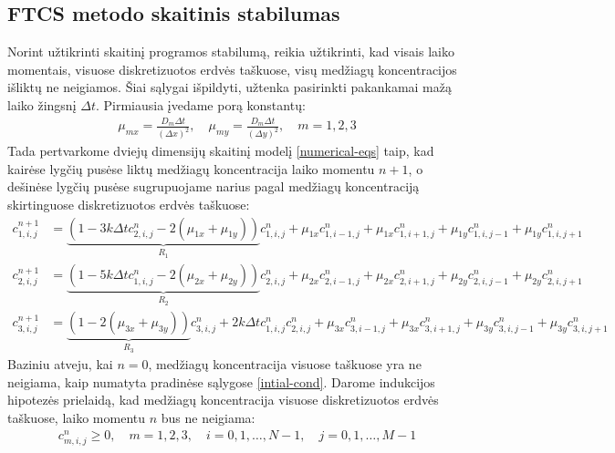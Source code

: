 \newpage
\subsection{FTCS metodo skaitinis stabilumas}

Norint užtikrinti skaitinį programos stabilumą, reikia užtikrinti, kad visais laiko momentais, visuose diskretizuotos erdvės taškuose, visų medžiagų koncentracijos išliktų ne neigiamos. Šiai sąlygai išpildyti, užtenka pasirinkti pakankamai mažą laiko žingsnį $\Delta t$. Pirmiausia įvedame porą konstantų:
\begin{align*}
\mu_{mx} = \frac{D_m\Delta t}{(\Delta x)^2}, \quad
\mu_{my} = \frac{D_m\Delta t}{(\Delta y)^2}, \quad m = 1, 2, 3
\end{align*}
Tada pertvarkome dviejų dimensijų skaitinį modelį \eqref{numerical-eqs} taip, kad kairėse lygčių pusėse liktų medžiagų koncentracija laiko momentu $n+1$, o dešinėse lygčių pusėse sugrupuojame narius pagal medžiagų koncentraciją skirtinguose diskretizuotos erdvės taškuose:
\begin{subequations} \label{eqs:r-coefs}
  \begin{align}
  c^{n+1}_{1,i,j}&=
  \underbrace{(1-3k\Delta tc^{n}_{2,i,j}-2(\mu_{1x}+\mu_{1y}))}_{R_1}c^n_{1,i,j}
  +\mu_{1x}c^n_{1,i-1,j}+\mu_{1x}c^n_{1,i+1,j}+\mu_{1y}c^n_{1,i,j-1}+\mu_{1y}c^n_{1,i,j+1} \label{r-coefs1}\\
  c^{n+1}_{2,i,j}&=
  \underbrace{(1-5k\Delta tc^{n}_{1,i,j}-2(\mu_{2x}+\mu_{2y}))}_{R_2}c^n_{2,i,j}
  +\mu_{2x}c^n_{2,i-1,j}+\mu_{2x}c^n_{2,i+1,j}+\mu_{2y}c^n_{2,i,j-1}+\mu_{2y}c^n_{2,i,j+1} \label{r-coefs2}\\
  c^{n+1}_{3,i,j}&=
  \underbrace{(1-2(\mu_{3x} + \mu_{3y}))}_{R_3}c^n_{3,i,j}+2k\Delta tc^{n}_{1,i,j}c^{n}_{2,i,j} 
  +\mu_{3x}c^n_{3,i-1,j}+\mu_{3x}c^n_{3,i+1,j}
  +\mu_{3y}c^n_{3,i,j-1}+\mu_{3y}c^n_{3,i,j+1}
  \label{r-coefs3}
  \end{align}
\end{subequations}
Baziniu atveju, kai $n=0$, medžiagų koncentracija visuose taškuose yra ne neigiama, kaip numatyta pradinėse sąlygose \eqref{intial-cond}. Darome indukcijos hipotezės prielaidą, kad medžiagų koncentracija visuose diskretizuotos erdvės taškuose, laiko momentu $n$ bus ne neigiama:
\begin{align} \label{induction-assumption}
  c^n_{m,i,j} \geqslant 0, \quad m=1,2,3,\quad i=0,1,\dots,N-1,\quad j=0,1,\dots,M-1
\end{align}
